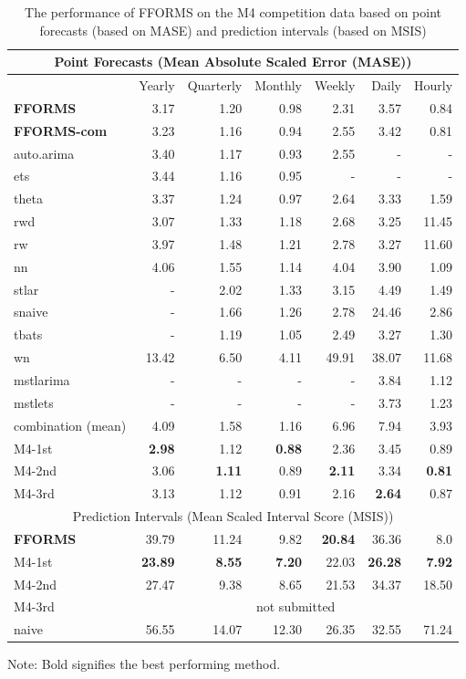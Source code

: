 \documentclass[11pt,a4paper,]{article}
\begin{document}
\begin{table}[!h]
\centering\scriptsize\tabcolsep=0.12cm
\begin{threeparttable}
\caption{The performance of FFORMS on the M4 competition data based on point forecasts (based on MASE) and prediction intervals (based on MSIS)}
\label{forecasts}
\begin{tabular}{l|rrrrrr}
\hline
\multicolumn{7}{c}{Point Forecasts (Mean Absolute Scaled Error (MASE))} \\\hline
 & Yearly & Quarterly & Monthly & Weekly & Daily & Hourly \\\hline
\bf{FFORMS} & 3.17 &  1.20 &  0.98&  2.31& 3.57 &  0.84\\
\bf{FFORMS-com} & 3.23 &  1.16 &  0.94&  2.55& 3.42 &  0.81\\
auto.arima & 3.40 &1.17  &0.93  & 2.55 &  -& - \\
ets & 3.44 &  1.16& 0.95 &  -&-  &  -\\
theta & 3.37 &1.24  & 0.97 &2.64  & 3.33 & 1.59 \\
rwd & 3.07 & 1.33 & 1.18  & 2.68  & 3.25 & 11.45 \\
rw & 3.97 & 1.48 & 1.21  &2.78  & 3.27 & 11.60 \\
nn & 4.06 & 1.55 &  1.14 &4.04 & 3.90 & 1.09 \\
stlar & - & 2.02 &  1.33& 3.15 & 4.49 & 1.49 \\
snaive & - &  1.66& 1.26 &  2.78& 24.46 & 2.86 \\
tbats & - & 1.19 &  1.05& 2.49 & 3.27 &  1.30\\
wn & 13.42 &  6.50&  4.11&  49.91& 38.07 & 11.68 \\
mstlarima & - & - &  - & - & 3.84 &  1.12\\
mstlets & - &  - &  - &  - & 3.73 &  1.23\\
combination (mean) & 4.09 & 1.58 &  1.16&6.96  & 7.94 & 3.93 \\\hline
M4-1st & \bf{2.98} & 1.12 &  \bf{0.88}& 2.36 & 3.45 & 0.89\\
M4-2nd & 3.06 & \bf{1.11} &  0.89& \bf{2.11} & 3.34 & \bf{0.81}\\
M4-3rd & 3.13 & 1.12 &  0.91& 2.16 & \bf{2.64} & 0.87\\\hline
\multicolumn{7}{c}{Prediction Intervals (Mean Scaled Interval Score (MSIS))} \\\hline
\bf{FFORMS} & 39.79 &  11.24 &  9.82&  \bf{20.84}& 36.36 & 8.0 \\
M4-1st & \bf{23.89} & \bf{8.55} &  \bf{7.20} & 22.03 & \bf{26.28} & \bf{7.92}\\
M4-2nd & 27.47 & 9.38 &  8.65& 21.53 & 34.37 & 18.50\\
M4-3rd & \multicolumn{6}{c}{not submitted}\\
naive & 56.55 & 14.07 &  12.30 & 26.35 & 32.55 & 71.24\\\hline
\end{tabular}
  \begin{tablenotes}
      \scriptsize
      \item Note: Bold signifies the best performing method.
    \end{tablenotes}
  \end{threeparttable}
\end{table}
\end{document}

